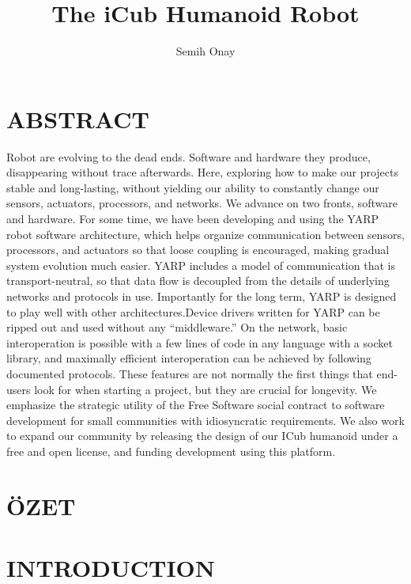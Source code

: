 \documentclass[a4paper, 11pt]{report}
\title{The iCub Humanoid Robot}
\author{Semih Onay}
\begin{document}
  \makecstitle
  
  \tableofcontents
  \listoffigures
  \listoftables
  
  \begin{symabbreviations}
    \sym{}{} 
  \end{symabbreviations}
  
{\tiny }\chapter*{ABSTRACT}
Robot are evolving to the dead ends. Software and hardware they produce, 
disappearing without trace afterwards. Here, exploring how to make our 
projects stable and long-lasting, without yielding our ability to 
constantly change our sensors, actuators, processors, and networks.
We advance on two fronts, software and hardware. For some time, we have been 
developing and using the YARP robot software architecture, which helps 
organize communication between sensors, processors, and actuators so that 
loose coupling is encouraged, making gradual system evolution much easier. YARP 
includes a model of communication that is transport-neutral, so that data 
flow is decoupled from the details of underlying networks and protocols in use. 
Importantly for the long term, YARP is designed to play well with other 
architectures.\linebreak Device drivers written for YARP can be ripped out and 
used without any “middleware.” On the network, basic interoperation is possible 
with a few lines of code in any language with a socket library, and maximally 
efficient interoperation can be achieved by following documented protocols. 
These features are not normally the first things that end-users look for when 
starting a project, but they are crucial for longevity.
We emphasize the strategic utility of the Free Software social contract to 
software development for small communities with idiosyncratic requirements. 
We also work to expand our community by releasing the design of our ICub 
humanoid under a free and open license, and funding development using this 
platform.
  
  \chapter*{ÖZET}
  
  \chapter{INTRODUCTION}
  
\end{document}
